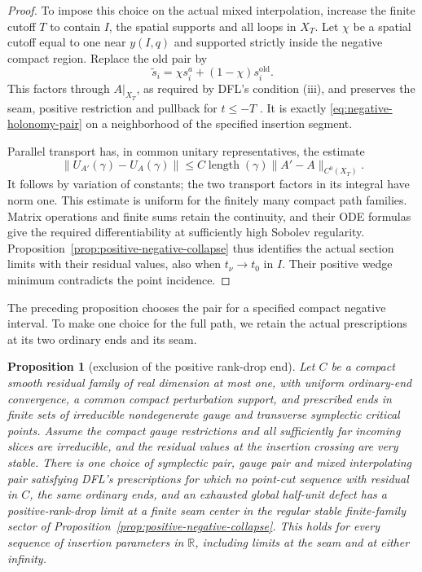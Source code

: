 \documentclass[11pt]{amsart}
\newtheorem{proposition}[theorem]{Proposition}
\theoremstyle{definition}
\theoremstyle{remark}
\theoremstyle{plain}
\begin{document}
\begin{proof}
To impose this choice on the actual mixed interpolation,
increase the finite cutoff $T$ to contain $I$, the spatial
supports and all loops in $X_T$. Let $\chi$ be a spatial
cutoff equal to one near $y(I,q)$ and supported strictly
inside the negative compact region. Replace the old pair by
\[
                    \widetilde s_i
                         =\chi s_i^a+(1-\chi)s_i^{\mathrm{old}}.
\]
This factors through $A|_{X_T}$, as required by DFL's
condition (iii), and preserves the seam, positive restriction
and pullback for $t\leq-T$
\cite[Section~7.2, equations~(7.9)--(7.10)]{DaeFukLip21a}.
It is exactly \eqref{eq:negative-holonomy-pair} on a
neighborhood of the specified insertion segment.

Parallel transport has, in common unitary representatives,
the estimate
\begin{equation}\label{eq:negative-holonomy-continuity}
 \|U_{A'}(\gamma)-U_A(\gamma)\|
       \leq C\operatorname{length}(\gamma)\|A'-A\|_{C^0(X_T)}.
\end{equation}
It follows by variation of constants; the two transport
factors in its integral have norm one. This estimate is
uniform for the finitely many compact path families.
Matrix operations and finite sums retain the continuity,
and their ODE formulas give the required differentiability
at sufficiently high Sobolev regularity.
Proposition~\ref{prop:positive-negative-collapse} thus
identifies the actual section limits with their residual
values, also when $t_\nu\to t_0$ in $I$.
Their positive wedge minimum contradicts the point incidence.
\end{proof}

The preceding proposition chooses the pair for a specified compact
negative interval. To make one choice for the full path, we retain
the actual prescriptions at its two ordinary ends and its seam.

\begin{proposition}[exclusion of the positive rank-drop end]
\label{prop:positive-end-exclusion}
Let $C$ be a compact smooth residual family of real dimension
at most one, with uniform ordinary-end convergence, a common
compact perturbation support, and prescribed ends in finite sets
of irreducible nondegenerate gauge and transverse symplectic
critical points. Assume the compact gauge restrictions and all
sufficiently far incoming slices are irreducible, and the residual
values at the insertion crossing are very stable.
There is one choice of symplectic pair, gauge pair and mixed
interpolating pair satisfying DFL's prescriptions for which no
point-cut sequence with residual in $C$, the same ordinary ends,
and an exhausted global half-unit defect has a positive-rank-drop
limit at a finite seam center in the regular stable finite-family
sector of Proposition~\ref{prop:positive-negative-collapse}.
This holds for every sequence of insertion parameters in $\mathbb R$,
including limits at the seam and at either infinity.
\end{proposition}
\end{document}
